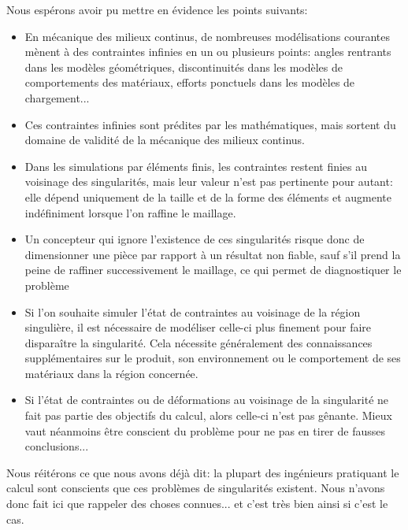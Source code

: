 Nous espérons avoir pu mettre en évidence les points suivants:
\begin{itemize}
  \item En mécanique des milieux continus, de nombreuses modélisations courantes mènent à des
	contraintes infinies en un ou plusieurs points: angles rentrants dans les modèles
	géométriques, discontinuités dans les modèles de comportements des matériaux, efforts
	ponctuels dans les modèles de chargement...
  \item Ces contraintes infinies sont prédites par les mathématiques, mais sortent du domaine de
	validité de la mécanique des milieux continus.
  \item Dans les simulations par éléments finis, les contraintes restent finies au voisinage des
	singularités, mais leur valeur n'est pas pertinente pour autant: elle dépend uniquement
	de la taille et de la forme des éléments et augmente indéfiniment lorsque l'on raffine le
	maillage.
  \item Un concepteur qui ignore l'existence de ces singularités risque donc de dimensionner une
	pièce par rapport à un résultat non fiable, sauf s'il prend la peine de raffiner
	successivement le maillage, ce qui permet de diagnostiquer le problème 
  \item Si l'on souhaite simuler l'état de contraintes au voisinage de la région singulière, il est
	nécessaire de modéliser celle-ci plus finement pour faire disparaître la singularité. Cela
	nécessite généralement des connaissances supplémentaires sur le produit, son
	environnement ou le comportement de ses matériaux dans la région concernée.
  \item Si l'état de contraintes ou de déformations au voisinage de la singularité ne fait pas
	partie des objectifs du calcul, alors celle-ci n'est pas gênante. Mieux vaut néanmoins être
	conscient du problème pour ne pas en tirer de fausses conclusions...
\end{itemize}

\medskip
Nous réitérons ce que nous avons déjà dit: la plupart des ingénieurs pratiquant le calcul
sont conscients que ces problèmes de singularités existent. Nous n'avons donc fait ici que
rappeler des choses connues... et c'est très bien ainsi si c'est le cas.













